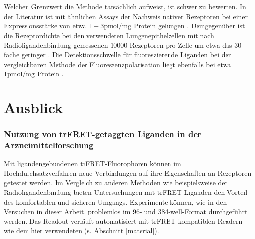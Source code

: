 Welchen Grenzwert die Methode tatsächlich aufweist, ist schwer zu bewerten. In der Literatur ist mit ähnlichen Assays der Nachweis nativer Rezeptoren bei einer Expressionsstärke von etwa $1-3 \si{\pico \mol / \milli\gram}$ Protein gelungen \parencite{Albizu2010}. Demgegenüber ist die Rezeptordichte bei den verwendeten Lungenepithelzellen mit nach Radioligandenbindung gemessenen 10000 Rezeptoren pro Zelle um etwa das 30-fache geringer \parencite{Abraham2004}. Die Detektionsschwelle für fluoreszierende Liganden bei der vergleichbaren Methode der Fluoreszenzpolarisation liegt ebenfalls bei etwa $1 \si{\pico \mol / \milli\gram}$ Protein \parencite{Gagne2002, DeJong2005}. 

\section{Ausblick}
\subsubsection{Nutzung von trFRET-getaggten Liganden in der Arzneimittelforschung}
Mit ligandengebundenen trFRET-Fluorophoren können im Hochdurchsatzverfahren neue Verbindungen auf ihre Eigenschaften an Rezeptoren getestet werden. Im Vergleich zu anderen Methoden wie beispielsweise der Radioligandenbindung bieten Untersuchungen mit trFRET-Liganden den Vorteil des komfortablen und sicheren Umgangs. Experimente können, wie in den Versuchen in dieser Arbeit, problemlos im 96- und 384-well-Format durchgeführt werden. Das Readout verläuft automatisiert mit trFRET-kompatiblen Readern wie dem hier verwendeten (s. Abschnitt \ref{material}).

